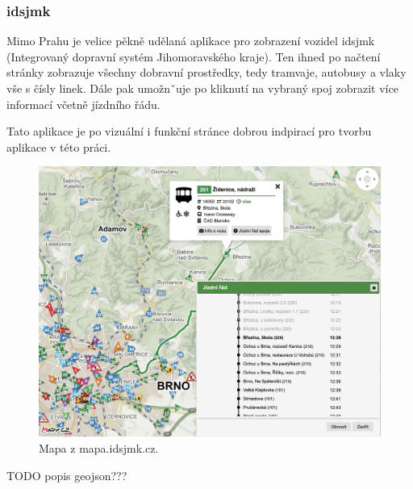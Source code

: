 \subsubsection{\gls{idsjmk}}

Mimo Prahu je velice pěkně udělaná aplikace pro zobrazení vozidel \gls{idsjmk} (Integrovaný dopravní systém Jihomoravského kraje). Ten ihned po načtení stránky zobrazuje všechny dobravní prostředky, tedy tramvaje, autobusy a vlaky vše s čísly linek. Dále pak umožnˇuje po kliknutí na vybraný spoj zobrazit více informací včetně jízdního řádu.

\bigbreak

Tato aplikace je po vizuální i funkční stránce dobrou indpirací pro tvorbu aplikace v této práci.

\begin{figure}
  \includegraphics[width=\linewidth]{../img/idsjmk_mapa.png}
  \caption{Mapa z mapa.idsjmk.cz.}
  \label{fig:idsjmk_result}
\end{figure}


TODO popis geojson???
